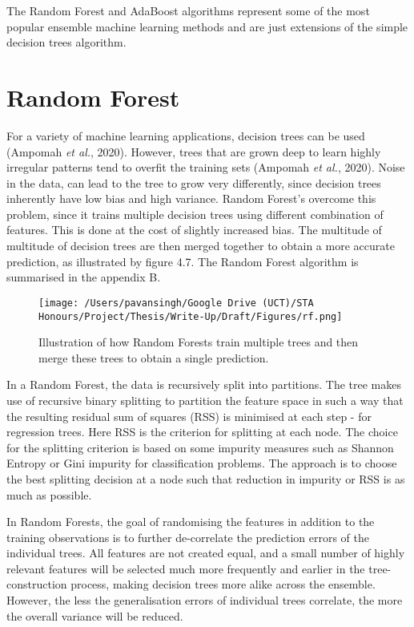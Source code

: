The Random Forest and AdaBoost algorithms represent some of the most popular ensemble machine learning methods and are just extensions of the simple decision trees algorithm. 

\section{Random Forest}

For a variety of machine learning applications, decision trees can be used (Ampomah \textit{et al.}, 2020). However, trees that are grown deep to learn highly irregular patterns tend to overfit the training sets (Ampomah \textit{et al.}, 2020). Noise in the data, can lead to the tree to grow very differently, since decision trees inherently have low bias and high variance. Random Forest's overcome this problem, since it trains multiple decision trees using different combination of features. This is done at the cost of slightly increased bias. The multitude of multitude of decision trees are then merged together to obtain a more accurate prediction, as illustrated by figure 4.7. The Random Forest algorithm is summarised in the appendix B.

\begin{figure}[h]
\centering
  \texttt{[image: /Users/pavansingh/Google Drive (UCT)/STA Honours/Project/Thesis/Write-Up/Draft/Figures/rf.png]}
  \caption{Illustration of how Random Forests train multiple trees and then merge these trees to obtain a single prediction.}
  \label{}
\end{figure}

In a Random Forest, the data is recursively split into partitions. The tree makes use of recursive binary splitting to partition the feature space in such a way that the resulting residual sum of squares (RSS) is minimised at each step - for regression trees. Here RSS is the criterion for splitting at each node. The choice for the splitting criterion is based on some impurity measures such as Shannon Entropy or Gini impurity for classification problems. The approach is to choose the best splitting decision at a node such that reduction in impurity or RSS is as much as possible. 

In Random Forests, the goal of randomising the features in addition to the training observations is to further de-correlate the prediction errors of the individual trees. All features are not created equal, and a small number of highly relevant features will be selected much more frequently and earlier in the tree-construction process, making decision trees more alike across the ensemble. However, the less the generalisation errors of individual trees correlate, the more the overall variance will be reduced. 


